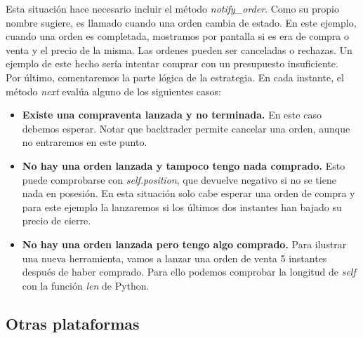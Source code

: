 \documentclass[12pt,a4paper]{article}
\begin{document}
		Esta situaci\'on hace necesario incluir el m\'etodo \textit{notify\_order}. Como su propio nombre sugiere, es llamado cuando una orden cambia de estado. En este ejemplo, cuando una orden es completada, mostramos por pantalla si es era de compra o venta y el precio de la misma. Las ordenes pueden ser canceladas o rechazas. Un ejemplo de este hecho ser\'ia intentar comprar con un presupuesto insuficiente.\\
		
		Por \'ultimo, comentaremos la parte l\'ogica de la estrategia. En cada instante, el m\'etodo \textit{next} eval\'ua alguno de los siguientes casos:
		
		\begin{itemize}
			\item \textbf{Existe una compraventa lanzada y no terminada.} En este caso debemos esperar. Notar que backtrader permite cancelar una orden, aunque no entraremos en este punto.
			\item \textbf{No hay una orden lanzada y tampoco tengo nada comprado.} Esto puede comprobarse con \textit{self.position}, que devuelve negativo si no se tiene nada en posesi\'on. En esta situaci\'on solo cabe esperar una orden de compra y para este ejemplo la lanzaremos si los \'ultimos dos instantes han bajado su precio de cierre.
			\item \textbf{No hay una orden lanzada pero tengo algo comprado.} Para ilustrar una nueva herramienta, vamos a lanzar una orden de venta 5 instantes despu\'es de haber comprado. Para ello podemos comprobar la longitud de \textit{self} con la funci\'on \textit{len} de Python.
		\end{itemize}
		
		
		\subsection{Otras plataformas}
\end{document}
